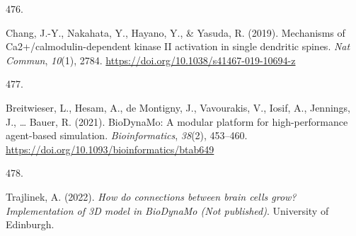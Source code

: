 \documentclass[
  11pt,
  letterpaper,
]{scrreprt}
\newlength{\cslhangindent}
\newlength{\csllabelwidth}
\newenvironment{CSLReferences}[2] %
 {\begin{list}{}{%
  \setlength{\itemindent}{0pt}
  \setlength{\leftmargin}{0pt}
  \setlength{\parsep}{0pt}
  \ifodd #1
   \setlength{\leftmargin}{\cslhangindent}
   \setlength{\itemindent}{-1\cslhangindent}
  \fi
  \setlength{\itemsep}{#2\baselineskip}}}
 {\end{list}}
\newcommand{\CSLLeftMargin}[1]{\parbox[t]{\csllabelwidth}{\strut#1\strut}}
\newcommand{\CSLRightInline}[1]{\parbox[t]{\linewidth - \csllabelwidth}{\strut#1\strut}}
\begin{document}
\begin{CSLReferences}{0}{0}
\CSLLeftMargin{476. }%
\CSLRightInline{Chang, J.-Y., Nakahata, Y., Hayano, Y., \& Yasuda, R.
(2019). Mechanisms of {Ca2}+/calmodulin-dependent kinase {II} activation
in single dendritic spines. \emph{Nat Commun}, \emph{10}(1), 2784.
\url{https://doi.org/10.1038/s41467-019-10694-z}}

\CSLLeftMargin{477. }%
\CSLRightInline{Breitwieser, L., Hesam, A., de Montigny, J., Vavourakis,
V., Iosif, A., Jennings, J., \ldots{} Bauer, R. (2021). {BioDynaMo}: A
modular platform for high-performance agent-based simulation.
\emph{Bioinformatics}, \emph{38}(2), 453--460.
\url{https://doi.org/10.1093/bioinformatics/btab649}}

\CSLLeftMargin{478. }%
\CSLRightInline{Trajlinek, A. (2022). \emph{How do connections between
brain cells grow? {Implementation} of {3D} model in {BioDynaMo} ({Not}
published)}. University of Edinburgh.}

\end{CSLReferences}



\printindex
\end{document}
